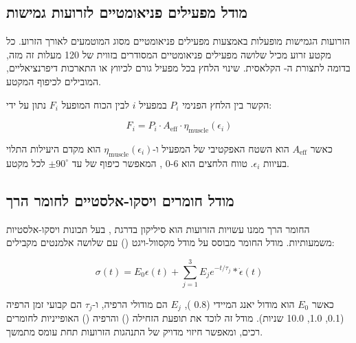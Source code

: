 \subsection{מודל מפעילים פניאומטיים לזרועות גמישות}
\label{sec:kinematics_actuators}

הזרועות הגמישות מופעלות באמצעות מפעילים פניאומטיים מסוג  המוטמעים לאורך הזרוע. כל מקטע זרוע מכיל שלושה מפעילים פניאומטיים המסודרים בזווית של 120 מעלות זה מזה, בדומה לתצורת ה- הקלאסית. שינוי הלחץ בכל מפעיל גורם לכיווץ או התארכות דיפרנציאליים, המובילים לכיפוף המקטע.

הקשר בין הלחץ הפנימי $P_i$ במפעיל $i$ לבין הכוח המופעל $F_i$ נתון על ידי:

\begin{equation}
F_i = P_i \cdot A_{\text{eff}} \cdot \eta_{\text{muscle}}(\epsilon_i)
\label{eq:pam_force}
\end{equation}

כאשר $A_{\text{eff}}$ הוא השטח האפקטיבי של המפעיל ו-$\eta_{\text{muscle}}(\epsilon_i)$ הוא מקדם היעילות התלוי בעיוות $\epsilon_i$. טווח הלחצים הוא 0-6 , המאפשר כיפוף של עד $\pm 90^\circ$ לכל מקטע.

\subsection{מודל חומרים ויסקו-אלסטיים לחומר הרך}
\label{sec:kinematics_material}

החומר הרך ממנו עשויות הזרועות הוא סיליקון בדרגת , בעל תכונות ויסקו-אלסטיות משמעותיות. מודל החומר מבוסס על מודל מקסוול-ויגט () עם שלושה אלמנטים מקבילים:

\begin{equation}
\sigma(t) = E_0 \epsilon(t) + \sum_{j=1}^{3} E_j e^{-t/\tau_j} * \dot{\epsilon}(t)
\label{eq:viscoelastic}
\end{equation}

כאשר $E_0$ הוא מודול יאנג המיידי (0.8 ), $E_j$ הם מודולי הרפיה, ו-$\tau_j$ הם קבועי זמן הרפיה (0.1, 1.0, 10.0 שניות). מודל זה לוכד את תופעת הזחילה () והרפיה () האופייניות לחומרים רכים, ומאפשר חיזוי מדויק של התנהגות הזרועות תחת עומס מתמשך.

\begin{table}[htbp]
\centering
\caption{השוואת מודלים קינמטיים לרובוטים רציפים.}
\label{tab:kinematic_models}
\end{table}

